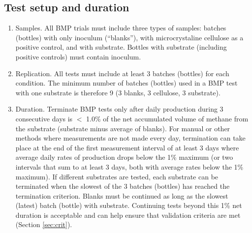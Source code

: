 \documentclass[]{article}
\begin{document}
\subsection{Test setup and duration}
\begin{enumerate}
  \item Samples. 
    All BMP trials must include three types of samples: batches (bottles) with only inoculum (``blanks''), with microcrystaline cellulose as a positive control, and with substrate.
    Bottles with substrate (including positive controls) must contain inoculum.
  \item Replication. 
    All tests must include at least 3 batches (bottles) for each condition.
    The minimum number of batches (bottles) used in a BMP test with one substrate is therefore 9 (3 blanks, 3 cellulose, 3 substrate).
  \item Duration. 
    Terminate BMP tests only after daily  production during 3 consecutive days is $<$ 1.0\% of the net accumulated volume of methane from the substrate (substrate minus average of blanks). 
    For manual or other methods where measurements are not made every day, termination can take place at the end of the first measurement interval of at least 3 days where average daily rates of production drops below the 1\% maximum (or two intervals that sum to at least 3 days, both with average rates below the 1\% maximum).
    If different substrates are tested, each substrate can be terminated when the slowest of the 3 batches (bottles) has reached the termination criterion.
    Blanks must be continued as long as the slowest (latest) batch (bottle) with substrate.
    Continuing tests beyond this 1\% net duration is acceptable and can help ensure that validation criteria are met (Section \ref{sec:crit}).
\end{enumerate}
\end{document}
